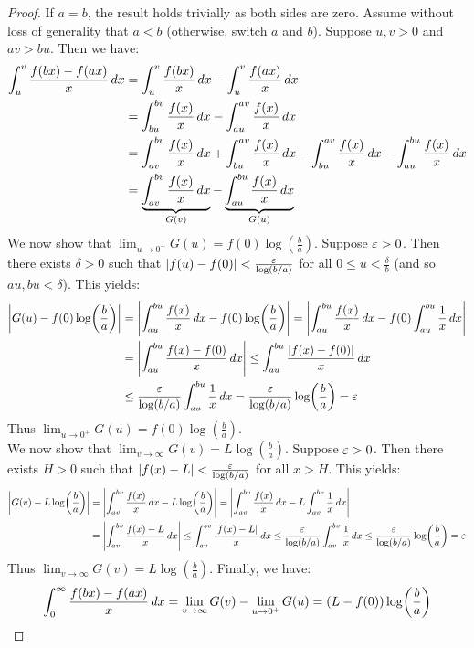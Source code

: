 \documentclass[main.tex]{subfiles}
\begin{document}
\begin{proof}
    If $a=b$, the result holds trivially as both sides are zero. Assume without loss of generality that $a<b$ (otherwise, switch $a$ and $b$). Suppose $u,v>0$ and $av>bu$. Then we have:
    \begin{align*}
        \int_u^v \frac{f(bx)-f(ax)}{x}\,dx
        &= \int_u^v \frac{f(bx)}{x}\,dx - \int_u^v \frac{f(ax)}{x}\,dx \\
        &= \int_{bu}^{bv} \frac{f(x)}{x}\,dx - \int_{au}^{av} \frac{f(x)}{x}\,dx \\
        &= \int_{av}^{bv} \frac{f(x)}{x}\,dx + \int_{bu}^{av} \frac{f(x)}{x}\,dx - \int_{bu}^{av} \frac{f(x)}{x}\,dx - \int_{au}^{bu} \frac{f(x)}{x}\,dx \\
        &= \underbrace{\int_{av}^{bv} \frac{f(x)}{x}\,dx}_{G(v)} - \underbrace{\int_{au}^{bu} \frac{f(x)}{x}\,dx}_{G(u)}
    \end{align*}
    We now show that $\lim_{u\to0^+} G(u)=f(0)\log(\frac{b}{a})$. Suppose $\varepsilon>0$. Then there exists $\delta>0$ such that $\abs{f(u)-f(0)}<\frac{\varepsilon}{\log(b/a)}$ for all $0\le u<\frac{\delta}{b}$ (and so $au,bu<\delta$). This yields:
    \begin{align*}
        \abs{G(u)-f(0)\log(\frac{b}{a})}
        &= \abs{\int_{au}^{bu} \frac{f(x)}{x}\,dx-f(0)\log(\frac{b}{a})}
        = \abs{\int_{au}^{bu} \frac{f(x)}{x}\,dx-f(0)\int_{au}^{bu} \frac{1}{x}\,dx} \\
        &= \abs{\int_{au}^{bu} \frac{f(x)-f(0)}{x}\,dx}
        \le \int_{au}^{bu} \frac{\abs{f(x)-f(0)}}{x}\,dx \\
        &\le \frac{\varepsilon}{\log(b/a)}\int_{au}^{bu} \frac{1}{x}\,dx
        = \frac{\varepsilon}{\log(b/a)}\log(\frac{b}{a})
        =\varepsilon
    \end{align*}
    Thus $\lim_{u\to0^+} G(u)=f(0)\log(\frac{b}{a})$.\\

    We now show that $\lim_{v\to\infty} G(v)=L\log(\frac{b}{a})$. Suppose $\varepsilon>0$. Then there exists $H>0$ such that $\abs{f(x)-L}<\frac{\varepsilon}{\log(b/a)}$ for all $x>H$. This yields:
    \begin{align*}
        \abs{G(v)-L\log(\frac{b}{a})}
        &= \abs{\int_{av}^{bv} \frac{f(x)}{x}\,dx-L\log(\frac{b}{a})}
        = \abs{\int_{av}^{bv} \frac{f(x)}{x}\,dx-L\int_{av}^{bv} \frac{1}{x}\,dx} \\
        &= \abs{\int_{av}^{bv} \frac{f(x)-L}{x}\,dx}
        \le \int_{av}^{bv} \frac{\abs{f(x)-L}}{x}\,dx
        \le \frac{\varepsilon}{\log(b/a)}\int_{av}^{bv} \frac{1}{x}\,dx
        \le \frac{\varepsilon}{\log(b/a)}\log(\frac{b}{a})
        =\varepsilon
    \end{align*}
    Thus $\lim_{v\to\infty} G(v)=L\log(\frac{b}{a})$. Finally, we have:
    \begin{equation*}
        \int_0^\infty \frac{f(bx)-f(ax)}{x}\,dx
        = \lim_{v\to\infty} G(v) - \lim_{u\to0^+} G(u)
        = (L-f(0))\log(\frac{b}{a}) \qedhere
    \end{equation*}
\end{proof}
\end{document}
